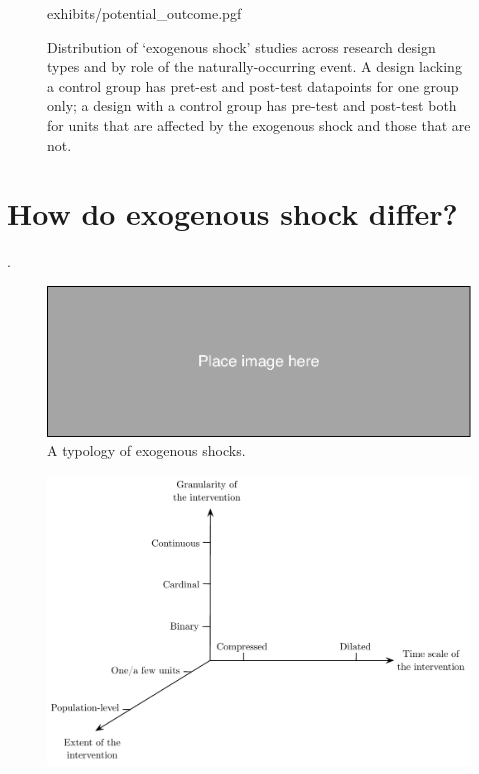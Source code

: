 \begin{refsection}
\clearpage

\begin{figure}
  \raggedleft
  \begin{small}
      {exhibits/potential_outcome.pgf}
    \caption{Distribution of `exogenous shock' studies across research 
    design types and by role of the naturally-occurring event. A design 
    lacking a control group has pret-est and post-test datapoints for 
    one group only; a design with a control group has pre-test and 
    post-test both for units that are affected by the exogenous shock and 
    those that are not.}
    \label{fig:potential_outcome}
  \end{small}
\end{figure}


\section{How do exogenous shock differ?}
\label{sec:how_exogenous_shocks_differ}

.

\begin{figure}[!htbp]
  \includegraphics[width=1\textwidth]{exhibits/place_holder.pdf}
  \caption{A typology of exogenous shocks.}
  \label{fig:exogeneous_shocks_types}
\end{figure}

\begin{figure}
    \begin{center}
      \includegraphics[width=1\textwidth]{exhibits/typology.pdf}
    \end{center}
    \caption{}
    \label{fig:}
\end{figure}



\end{refsection}
